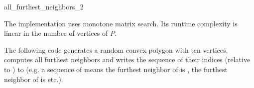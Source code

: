 \begin{ccRefFunction}{all_furthest_neighbors_2}
  \ccSeeAlso
  \\
 
  \ccImplementation The implementation uses monotone matrix
  search\cite{akmsw-gamsa-87}. Its runtime complexity is linear in the
  number of vertices of $P$.
  
  \ccExample The following code generates a random convex polygon
   with ten vertices, computes all furthest neighbors and
  writes the sequence of their indices (relative to
  ) to  (e.g. a sequence of
   means the furthest neighbor of
   is , the furthest
  neighbor of  is  etc.).
  
\end{ccRefFunction}

